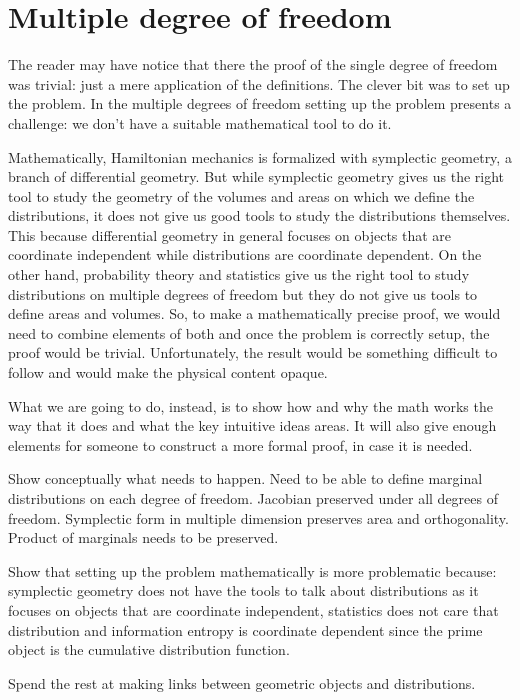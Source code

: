 \documentclass[aps,pra,10pt,twocolumn,floatfix,nofootinbib]{revtex4-1}
\begin{document}
\section{Multiple degree of freedom}

The reader may have notice that there the proof of the single degree of freedom was trivial: just a mere application of the definitions. The clever bit was to set up the problem. In the multiple degrees of freedom setting up the problem presents a challenge: we don't have a suitable mathematical tool to do it.

Mathematically, Hamiltonian mechanics is formalized with symplectic geometry, a branch of differential geometry. But while symplectic geometry gives us the right tool to study the geometry of the volumes and areas on which we define the distributions, it does not give us good tools to study the distributions themselves. This because differential geometry in general focuses on objects that are coordinate independent while distributions are coordinate dependent. On the other hand, probability theory and statistics give us the right tool to study distributions on multiple degrees of freedom but they do not give us tools to define areas and volumes. So, to make a mathematically precise proof, we would need to combine elements of both and once the problem is correctly setup, the proof would be trivial. Unfortunately, the result would be something difficult to follow and would make the physical content opaque.

What we are going to do, instead, is to show how and why the math works the way that it does and what the key intuitive ideas areas. It will also give enough elements for someone to construct a more formal proof, in case it is needed.

Show conceptually what needs to happen. Need to be able to define marginal distributions on each degree of freedom. Jacobian preserved under all degrees of freedom. Symplectic form in multiple dimension preserves area and orthogonality. Product of marginals needs to be preserved.

Show that setting up the problem mathematically is more problematic because: symplectic geometry does not have the tools to talk about distributions as it focuses on objects that are coordinate independent, statistics does not care that distribution and information entropy is coordinate dependent since the prime object is the cumulative distribution function.

Spend the rest at making links between geometric objects and distributions.
\end{document}
